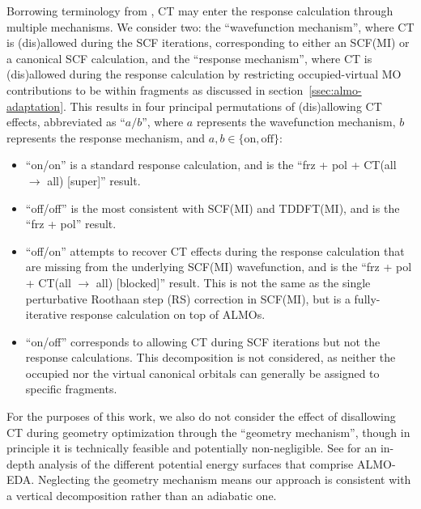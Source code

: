 \documentclass[%
  class = book,%
  crop = false,%
  float = true,%
  multi = true,%
  preview = false,%
]{standalone}
\begin{document}
Borrowing terminology from , CT may enter the response calculation through multiple mechanisms. We consider two: the ``wave\-function mechanism'', where CT is (dis)\-allowed during the SCF iterations, corresponding to either an SCF(MI) or a canonical SCF calculation, and the ``response mechanism'', where CT is (dis)\-allowed during the response calculation by restricting occupied-virtual MO contributions to be within fragments as discussed in section~\ref{ssec:almo-adaptation}. This results in four principal permutations of (dis)\-allowing CT effects, abbreviated as ``\(a/b\)'', where \(a\) represents the wavefunction mechanism, \(b\) represents the response mechanism, and \(a,b\in\{\text{on},\text{off}\}\):

\begin{itemize}
\item ``on/on'' is a standard response calculation, and is the ``frz + pol + CT(all \(\rightarrow\) all) [super]'' result.
\item ``off/off'' is the most consistent with SCF(MI) and TDDFT(MI), and is the ``frz + pol'' result.
\item ``off/on'' attempts to recover CT effects during the response calculation that are missing from the underlying SCF(MI) wavefunction, and is the ``frz + pol + CT(all \(\rightarrow\) all) [blocked]'' result. This is not the same as the single perturbative Roothaan step (RS) correction in SCF(MI), but is a fully-iterative response calculation on top of ALMOs.
\item ``on/off'' corresponds to allowing CT during SCF iterations but not the response calculations. This decomposition is not considered, as neither the occupied nor the virtual canonical orbitals can generally be assigned to specific fragments.
\end{itemize}

For the purposes of this work, we also do not consider the effect of disallowing CT during geometry optimization through the ``geometry mechanism'', though in principle it is technically feasible and potentially non-negligible. See  for an in-depth analysis of the different potential energy surfaces that comprise ALMO-EDA. Neglecting the geometry mechanism means our approach is consistent with a vertical decomposition rather than an adiabatic one.

\section{\texorpdfstring{}{Methods}}
\label{sec:methods}
\end{document}
